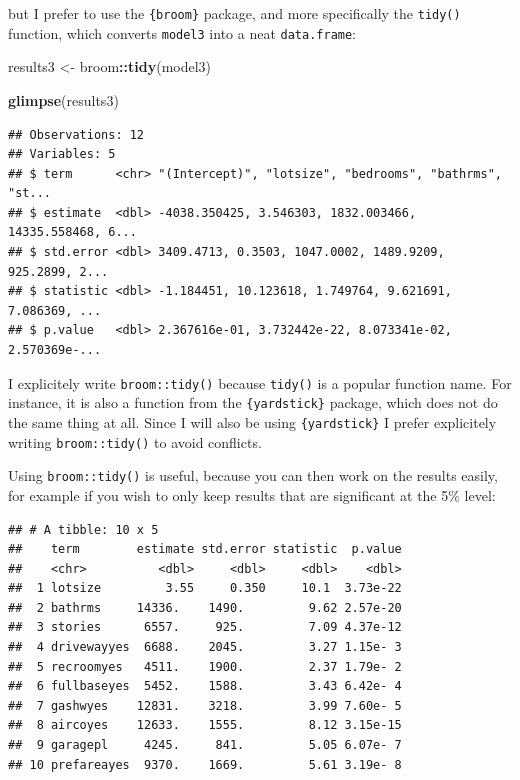 \documentclass[]{gitbook}
\newenvironment{Shaded}{\begin{snugshade}}{\end{snugshade}}
\newcommand{\FloatTok}[1]{\textcolor[rgb]{0.00,0.00,0.81}{#1}}
\newcommand{\KeywordTok}[1]{\textcolor[rgb]{0.13,0.29,0.53}{\textbf{#1}}}
\newcommand{\NormalTok}[1]{#1}
\newcommand{\OperatorTok}[1]{\textcolor[rgb]{0.81,0.36,0.00}{\textbf{#1}}}
\newcommand{\StringTok}[1]{\textcolor[rgb]{0.31,0.60,0.02}{#1}}
\theoremstyle{definition}
\theoremstyle{definition}
\theoremstyle{definition}
\theoremstyle{remark}
\begin{document}
but I prefer to use the \texttt{\{broom\}} package, and more
specifically the \texttt{tidy()} function, which converts
\texttt{model3} into a neat \texttt{data.frame}:

\begin{Shaded}
\begin{Highlighting}[]
\NormalTok{results3 <-}\StringTok{ }\NormalTok{broom}\OperatorTok{::}\KeywordTok{tidy}\NormalTok{(model3)}

\KeywordTok{glimpse}\NormalTok{(results3)}
\end{Highlighting}
\end{Shaded}

\begin{verbatim}
## Observations: 12
## Variables: 5
## $ term      <chr> "(Intercept)", "lotsize", "bedrooms", "bathrms", "st...
## $ estimate  <dbl> -4038.350425, 3.546303, 1832.003466, 14335.558468, 6...
## $ std.error <dbl> 3409.4713, 0.3503, 1047.0002, 1489.9209, 925.2899, 2...
## $ statistic <dbl> -1.184451, 10.123618, 1.749764, 9.621691, 7.086369, ...
## $ p.value   <dbl> 2.367616e-01, 3.732442e-22, 8.073341e-02, 2.570369e-...
\end{verbatim}

I explicitely write \texttt{broom::tidy()} because \texttt{tidy()} is a
popular function name. For instance, it is also a function from the
\texttt{\{yardstick\}} package, which does not do the same thing at all.
Since I will also be using \texttt{\{yardstick\}} I prefer explicitely
writing \texttt{broom::tidy()} to avoid conflicts.

Using \texttt{broom::tidy()} is useful, because you can then work on the
results easily, for example if you wish to only keep results that are
significant at the 5\% level:

\begin{Shaded}
\end{Shaded}

\begin{verbatim}
## # A tibble: 10 x 5
##    term        estimate std.error statistic  p.value
##    <chr>          <dbl>     <dbl>     <dbl>    <dbl>
##  1 lotsize         3.55     0.350     10.1  3.73e-22
##  2 bathrms     14336.    1490.         9.62 2.57e-20
##  3 stories      6557.     925.         7.09 4.37e-12
##  4 drivewayyes  6688.    2045.         3.27 1.15e- 3
##  5 recroomyes   4511.    1900.         2.37 1.79e- 2
##  6 fullbaseyes  5452.    1588.         3.43 6.42e- 4
##  7 gashwyes    12831.    3218.         3.99 7.60e- 5
##  8 aircoyes    12633.    1555.         8.12 3.15e-15
##  9 garagepl     4245.     841.         5.05 6.07e- 7
## 10 prefareayes  9370.    1669.         5.61 3.19e- 8
\end{verbatim}
\end{document}
